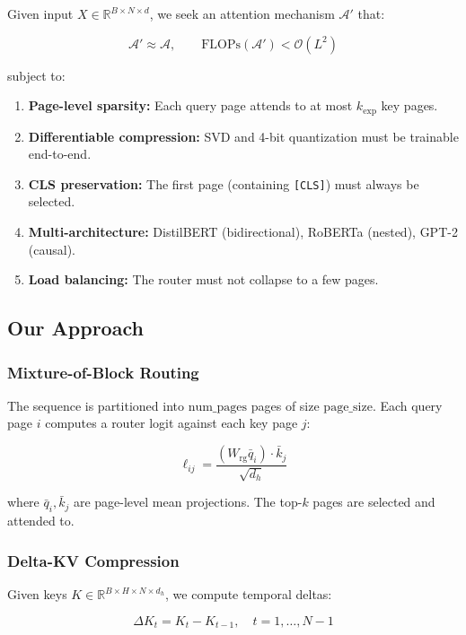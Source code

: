 Given input $X \in \mathbb{R}^{B \times N \times d}$, we seek an attention 
mechanism $\mathcal{A}'$ that:

\[
\mathcal{A}' \approx \mathcal{A}, \qquad
\text{FLOPs}(\mathcal{A}') < \mathcal{O}(L^2)
\tag{1.1}
\]

subject to:

\begin{enumerate}
\item \textbf{Page-level sparsity:} Each query page attends to at most $k_\text{exp}$
  key pages.
\item \textbf{Differentiable compression:} SVD and 4-bit quantization must be
  trainable end-to-end.
\item \textbf{CLS preservation:} The first page (containing \texttt{[CLS]}) must always be
  selected.
\item \textbf{Multi-architecture:} DistilBERT (bidirectional), RoBERTa (nested),
  GPT-2 (causal).
\item \textbf{Load balancing:} The router must not collapse to a few pages.

\end{enumerate}
\subsection{Our Approach}

\subsubsection{Mixture-of-Block Routing}

The sequence is partitioned into $\text{num\_pages}$ pages of size 
$\text{page\_size}$. Each query page $i$ computes a router logit against 
each key page $j$:

\[
\ell_{ij} = \frac{(W_\text{rg} \bar{q}_i) \cdot \bar{k}_j}{\sqrt{d_h}}
\tag{1.2}
\]

where $\bar{q}_i, \bar{k}_j$ are page-level mean projections. The top-$k$ 
pages are selected and attended to.

\subsubsection{Delta-KV Compression}

Given keys $K \in \mathbb{R}^{B \times H \times N \times d_h}$, we compute 
temporal deltas:

\[
\Delta K_t = K_t - K_{t-1}, \quad t = 1, \dots, N-1
\tag{1.3}
\]


